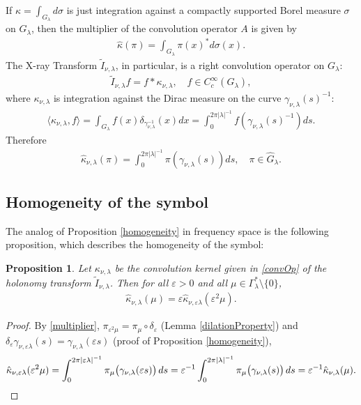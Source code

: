 \documentclass[11pt]{amsart}
\theoremstyle{plain}
\newtheorem{proposition}[theorem]{Proposition}
\theoremstyle{definition}
\theoremstyle{remark}
\numberwithin{equation}{section}
\def\mz{\setminus\{0\}}
\def\eps{\varepsilon}
\numberwithin{equation}{section}
\begin{document}
If $\kappa=\int_{G_\lambda} d\sigma$ is just integration against a compactly supported Borel measure $\sigma$ on $G_\lambda$, then the multiplier of the convolution operator $A$ is given by
\begin{align*}
	\hat{\kappa}(\pi)=\int_{G_\lambda}\pi(x)^*d\sigma(x).
\end{align*}
The X-ray Transform $\widetilde{I}_{\nu, \lambda}$, in particular,  is a right convolution operator on $G_\lambda$:
\begin{align}\label{convOp}
	\widetilde{I}_{\nu, \lambda}f=f*\kappa_{\nu, \lambda}, \quad f\in C_c^\infty(G_\lambda),
\end{align}
where $\kappa_{\nu, \lambda}$ is integration against the Dirac measure on the curve $\gamma_{\nu, \lambda}(s)^{-1}$:
\begin{align*}
	\langle \kappa_{\nu, \lambda}, f\rangle=\int_{G_\lambda}f(x)\delta_{\gamma_{\nu, \lambda}^{-1}}(x)dx=\int_0^{2\pi|\lambda|^{-1}}f(\gamma_{\nu, \lambda}(s)^{-1})ds.
\end{align*}
Therefore
\begin{align}
	\hat\kappa_{\nu, \lambda}(\pi)=\int_0^{2\pi|\lambda|^{-1}}\pi(\gamma_{\nu, \lambda}(s))ds, \quad \pi\in \widehat{G}_\lambda. \label{multiplier}
\end{align}
\subsection{Homogeneity of the symbol}
The analog of  Proposition \ref{homogeneity} in frequency space is the following proposition, which describes the homogeneity of the symbol:
\begin{proposition}\label{homofourier}
	Let $\kappa_{\nu, \lambda}$ be the convolution kernel given in \eqref{convOp} of the holonomy transform $\widetilde{I}_{\nu, \lambda}$. Then for all $\eps>0$ and all $\mu\in \Gamma_\lambda^*\mz$, 
	\begin{align*}
		\hat{\kappa}_{\nu, \lambda}(\mu)=\eps \hat{\kappa}_{\nu, \eps\lambda}(\eps^2\mu).
	\end{align*}
\end{proposition}
\begin{proof}
	By \eqref{multiplier}, $\pi_{\eps^2\mu}=\pi_\mu\circ\delta_\eps$ (Lemma \ref{dilationProperty}) and $\delta_\eps\gamma_{\nu, \eps\lambda}(s)=\gamma_{\nu, \lambda}(\eps s)$ (proof of Proposition \ref{homogeneity}),
	\begin{align*}
		\hat{\kappa}_{\nu, \eps\lambda}(\eps^2\mu)=\int_0^{2\pi|\eps\lambda|^{-1}}\pi_\mu\big(\gamma_{\nu, \lambda}(\eps s)\big)\, ds=\eps^{-1}\int_0^{2\pi|\lambda|^{-1}}\pi_\mu\big(\gamma_{\nu, \lambda}(s)\big)\, ds=\eps^{-1}\hat{\kappa}_{\nu, \lambda}(\mu).\qedhere
	\end{align*}
\end{proof}
\end{document}
